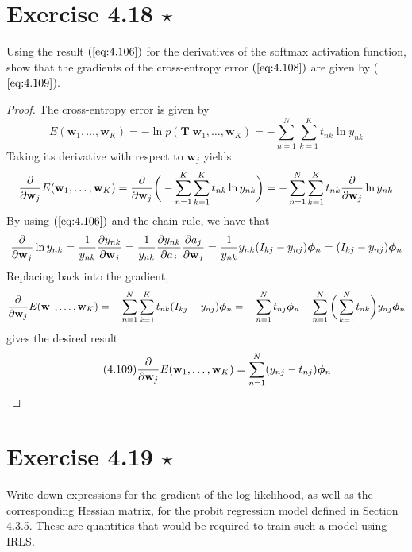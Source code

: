 \section*{Exercise 4.18 $\star$}
Using the result $(\ref{eq:4.106})$ for
the derivatives of the softmax activation function,
show that the gradients of the cross-entropy error $(\ref{eq:4.108})$
are given by ($\ref{eq:4.109}$).

\vspace{1em}

\begin{proof}
    The cross-entropy error is given by
    \begin{equation}\label{eq:4.108}\tag{4.108}
        E(\mathbf{w}_1, \ldots, \mathbf{w}_K)
        = -\ln p(\mathbf{T} | \mathbf{w}_1, \ldots, \mathbf{w}_K)
        = - \sum_{n=1}^{N} \sum_{k=1}^{K} t_{nk} \ln y_{nk}
    \end{equation}
    Taking its derivative with respect to $\mathbf{w}_j$ yields 
    \begin{align*}
        \pdv{\mathbf{w}_j} E(\mathbf{w}_1, \ldots, \mathbf{w}_K)
        = \pdv{\mathbf{w}_j} \bigg(-\sum_{n=1}^{K} \sum_{k=1}^{K} t_{nk} \ln y_{nk}\bigg) 
        = -\sum_{n=1}^{N} \sum_{k=1}^{K} t_{nk} \pdv{\mathbf{w}_j} \ln y_{nk} 
    \end{align*}
    By using $(\ref{eq:4.106})$ and the chain rule, we have that
    \begin{align*}
        \pdv{\mathbf{w}_j} \ln y_{nk}
        = \frac{1}{y_{nk}} \pdv{y_{nk}}{\mathbf{w}_j}
        = \frac{1}{y_{nk}} \pdv{y_{nk}}{a_j} \pdv{a_j}{\mathbf{w}_j}
        = \frac{1}{y_{nk}} y_{nk}(I_{kj} - y_{nj}) \bm{\phi}_n
        = (I_{kj} - y_{nj})\bm{\phi}_n
    \end{align*}
    Replacing back into the gradient,
    \[
        \pdv{\mathbf{w}_j} E(\mathbf{w}_1, \ldots, \mathbf{w}_K)
        = -\sum_{n=1}^{N} \sum_{k=1}^{K} t_{nk} (I_{kj} - y_{nj}) \bm{\phi}_n
        = -\sum_{n=1}^{N} t_{nj}\bm{\phi}_n 
        + \sum_{n=1}^{N} \bigg(\sum_{k=1}^{N} t_{nk}\bigg) y_{nj} \bm{\phi}_n
    \] 
    gives the desired result
    \begin{equation}\label{eq:4.109}\tag{4.109}
        \pdv{\mathbf{w}_j}E(\mathbf{w}_1, \ldots, \mathbf{w}_K)
        = \sum_{n=1}^{N} (y_{nj} - t_{nj})\bm{\phi}_n
    \end{equation}
\end{proof}

\section*{Exercise 4.19 $\star$}
Write down expressions for the gradient of the log likelihood,
as well as the corresponding Hessian matrix, for the probit regression
model defined in Section 4.3.5. These are quantities that would be required to train such 
a model using IRLS.

